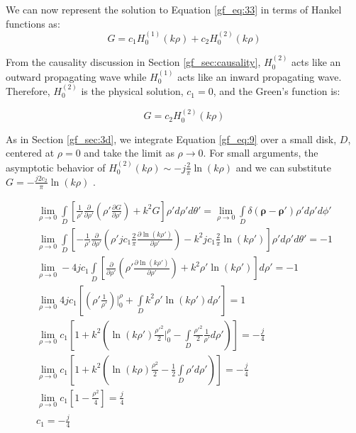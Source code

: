 We can now represent the solution to Equation \ref{gf_eq:33} in terms of Hankel functions as:
\begin{equation}
G = c_1H_0^{(1)}\left(k\rho\right) +c_2H_0^{(2)}\left(k\rho\right) 
\label{gf_eq:37}
\end{equation}
\renewcommand{\baselinestretch}{2} \small\normalsize

From the causality discussion in Section \ref{gf_sec:causality}, $H_0^{(2)}$ acts like an outward propagating wave while $H_0^{(1)}$ acts like an inward propagating wave. Therefore, $H_0^{(2)}$ is the physical solution, $c_1=0$, and the Green's function is:

\begin{equation}
G = c_2H_0^{(2)}\left(k\rho\right) 
\label{gf_eq:38}
\end{equation}
\renewcommand{\baselinestretch}{2} \small\normalsize

As in Section \ref{gf_sec:3d}, we integrate Equation \ref{gf_eq:9} over a small disk, $D$, centered at $\rho = 0$ and take the limit as $\rho \rightarrow 0$. For small arguments, the asymptotic behavior of $H_0^{(2)}(k\rho) \sim -j\frac{2}{\pi}\ln\left({k\rho}\right)$ and we can substitute $G = -\frac{j2c_2}{\pi}\ln\left({k\rho}\right)$ \cite{abramowitz_stegun}. 

\begin{equation}
\begin{gathered}
\lim_{\rho\to 0}\int\limits_{D} \left[ \frac{1}{\rho'}\frac{\partial}{\partial \rho'}\left(\rho' \frac{\partial G}{\partial \rho'} \right) + k^2G\right]\rho' d\rho' d\theta' = \lim_{\rho\to 0}\int\limits_{D} \delta\left(\boldsymbol{\rho}-\boldsymbol{\rho}' \right)\rho' d\rho' d\phi' \\
\lim_{\rho\to 0}\int\limits_{D} \left[ -\frac{1}{\rho'}\frac{\partial}{\partial \rho'}\left(\rho' jc_1\frac{2}{\pi}\frac{\partial \ln(k\rho')}{\partial \rho'} \right) - k^2jc_1\frac{2}{\pi}\ln(k\rho')\right]\rho' d\rho' d\theta' = -1 \\
\lim_{\rho\to 0}-4jc_1\int\limits_{D} \left[\frac{\partial}{\partial \rho'}\left(\rho' \frac{\partial \ln(k\rho')}{\partial \rho'} \right) + k^2\rho'\ln(k\rho')\right] d\rho' = -1 \\
\lim_{\rho\to 0}4jc_1\left[\left(\rho' \frac{1 }{\rho'} \right)\bigg|_0^{\rho} + \int\limits_{D}k^2\rho'\ln(k\rho') d\rho'\right] = 1 \\
\lim_{\rho\to 0}c_1\left[ 1 +  k^2\left( \ln(k\rho')\frac{\rho'^2}{2}\bigg|_0^{\rho} - \int\limits_{D}\frac{\rho'^2}{2}\frac{1}{\rho'} d\rho' \right)\right] = -\frac{j}{4} \\
\lim_{\rho\to 0}c_1\left[ 1 +  k^2\left( \ln(k\rho)\frac{\rho^2}{2} - \frac{1}{2}\int\limits_{D}\rho' d\rho' \right)\right] = -\frac{j}{4} \\
\lim_{\rho\to 0}c_1\left[ 1 - \frac{\rho^2}{4}\right] = \frac{j}{4} \\
c_1 = -\frac{j}{4}
\end{gathered}
\label{gf_eq:39}
\end{equation}
\renewcommand{\baselinestretch}{2} \small\normalsize

